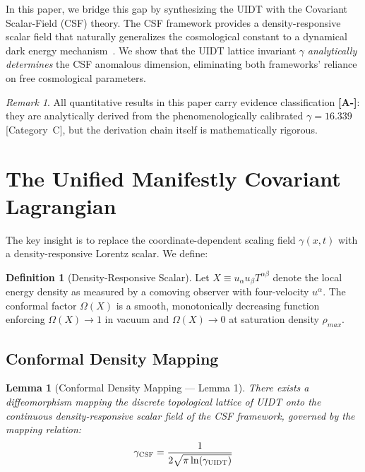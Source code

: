 \documentclass[12pt,a4paper,twoside]{article}
\theoremstyle{plain}
\newtheorem{lemma}[theorem]{Lemma}
\theoremstyle{definition}
\newtheorem{definition}[theorem]{Definition}
\theoremstyle{remark}
\newtheorem{remark}[theorem]{Remark}
\newcommand{\UIDT}{\textsc{UIDT}}
\newcommand{\CSF}{\textsc{CSF}}
\begin{document}
In this paper, we bridge this gap by synthesizing the \UIDT{} with the
Covariant Scalar-Field (\CSF{}) theory. The \CSF{} framework provides a
density-responsive scalar field that naturally generalizes the cosmological
constant to a dynamical dark energy mechanism~\cite{Barrow2020}. We show that
the \UIDT{} lattice invariant $\gamma$ \emph{analytically determines} the
\CSF{} anomalous dimension, eliminating both frameworks' reliance on free
cosmological parameters.

\begin{remark}
All quantitative results in this paper carry evidence classification
\textcolor{catAminus}{\textbf{[A-]}}: they are analytically derived from the
phenomenologically calibrated $\gamma = 16.339$ [Category~C], but the
derivation chain itself is mathematically rigorous.
\end{remark}


\section{The Unified Manifestly Covariant Lagrangian}
\label{sec:lagrangian}

The key insight is to replace the coordinate-dependent scaling field
$\gamma(x,t)$ with a density-responsive Lorentz scalar. We define:

\begin{definition}[Density-Responsive Scalar]
\label{def:density_scalar}
Let $X \equiv u_\alpha u_\beta T^{\alpha\beta}$ denote the local energy
density as measured by a comoving observer with four-velocity $u^\alpha$.
The conformal factor $\Omega(X)$ is a smooth, monotonically decreasing
function enforcing $\Omega(X) \to 1$ in vacuum and $\Omega(X) \to 0$ at
saturation density $\rho_{max}$.
\end{definition}

\subsection{Conformal Density Mapping}

\begin{lemma}[Conformal Density Mapping --- Lemma 1]
\label{lem:conformal_mapping}
There exists a diffeomorphism mapping the discrete topological lattice of
\UIDT{} onto the continuous density-responsive scalar field of the \CSF{}
framework, governed by the mapping relation:
\begin{equation}
    \gamma_{\CSF} = \frac{1}{2\sqrt{\pi \ln(\gamma_{\UIDT})}}
    \label{eq:conformal_map}
\end{equation}
\end{lemma}
\end{document}
